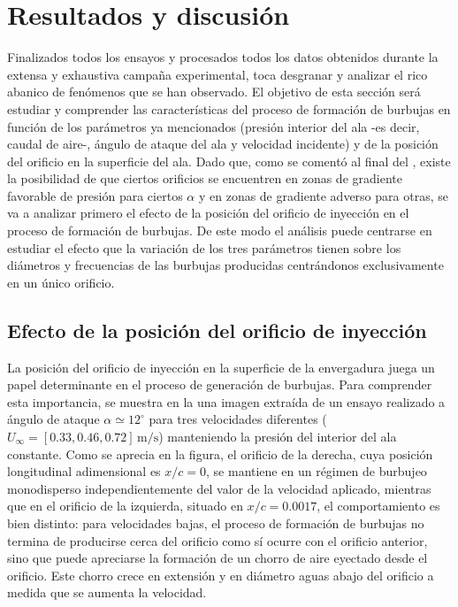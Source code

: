 \section{Resultados y discusión}

Finalizados todos los ensayos y procesados todos los datos obtenidos durante la extensa y exhaustiva campaña experimental, toca desgranar y analizar el rico abanico de fenómenos que se han observado. El objetivo de esta sección será estudiar y comprender las características del proceso de formación de burbujas en función de los parámetros ya mencionados (presión interior del ala -es decir, caudal de aire-, ángulo de ataque del ala y velocidad incidente) y de la posición del orificio en la superficie del ala. Dado que, como se comentó al final del , existe la posibilidad de que ciertos orificios se encuentren en zonas de gradiente favorable de presión para ciertos $\alpha$ y en zonas de gradiente adverso para otras, se va a analizar primero el efecto de la posición del orificio de inyección en el proceso de formación de burbujas. De este modo el análisis puede centrarse en estudiar el efecto que la variación de los tres parámetros tienen sobre los diámetros y frecuencias de las burbujas producidas centrándonos exclusivamente en un único orificio. 

\subsection{Efecto de la posición del orificio de inyección}

La posición del orificio de inyección en la superficie de la envergadura juega un papel determinante en el proceso de generación de burbujas. Para comprender esta importancia, se muestra en la  una imagen extraída de un ensayo realizado a ángulo  de ataque $\alpha \simeq 12^{\circ}$ para tres velocidades diferentes ($U_{\infty} = \left[0.33,0.46,0.72\right]\,\mathrm{m/s}$) manteniendo la presión del interior del ala constante. Como se aprecia en la figura, el orificio de la derecha, cuya posición longitudinal adimensional es $x/c = 0$, se mantiene en un régimen de burbujeo monodisperso independientemente del valor de la velocidad aplicado, mientras que en el orificio de la izquierda, situado en $x/c = 0.0017$, el comportamiento es bien distinto: para velocidades bajas, el proceso de formación de burbujas no termina de producirse cerca del orificio como sí ocurre con el orificio anterior, sino que puede apreciarse la formación de un chorro de aire eyectado desde el orificio. Este chorro crece en extensión y en diámetro aguas abajo del orificio a medida que se aumenta la velocidad.

